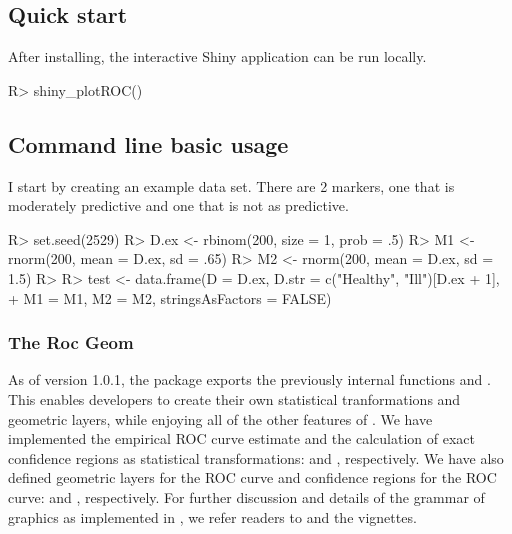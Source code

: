 \documentclass[codesnippet]{jss}
\begin{document}
\subsection{Quick start}\label{quick-start}

After installing, the interactive Shiny application can be run locally.

\begin{Schunk}
\begin{Sinput}
R> shiny_plotROC()
\end{Sinput}
\end{Schunk}

\subsection{Command line basic usage}\label{command-line-basic-usage}

I start by creating an example data set. There are 2 markers, one that
is moderately predictive and one that is not as predictive.

\begin{Schunk}
\begin{Sinput}
R> set.seed(2529)
R> D.ex <- rbinom(200, size = 1, prob = .5)
R> M1 <- rnorm(200, mean = D.ex, sd = .65)
R> M2 <- rnorm(200, mean = D.ex, sd = 1.5)
R> 
R> test <- data.frame(D = D.ex, D.str = c("Healthy", "Ill")[D.ex + 1], 
+                    M1 = M1, M2 = M2, stringsAsFactors = FALSE)
\end{Sinput}
\end{Schunk}

\subsubsection{The Roc Geom}\label{the-roc-geom}

As of version 1.0.1, the  package \citep{ggplot2} exports
the previously internal functions  and . This
enables developers to create their own statistical tranformations and
geometric layers, while enjoying all of the other features of
. We have implemented the empirical ROC curve estimate and
the calculation of exact confidence regions as statistical
transformations:  and , respectively. We
have also defined geometric layers for the ROC curve and confidence
regions for the ROC curve:  and ,
respectively. For further discussion and details of the grammar of
graphics as implemented in , we refer readers to
\citet{wickham2010layered} and the  vignettes.
\end{document}
